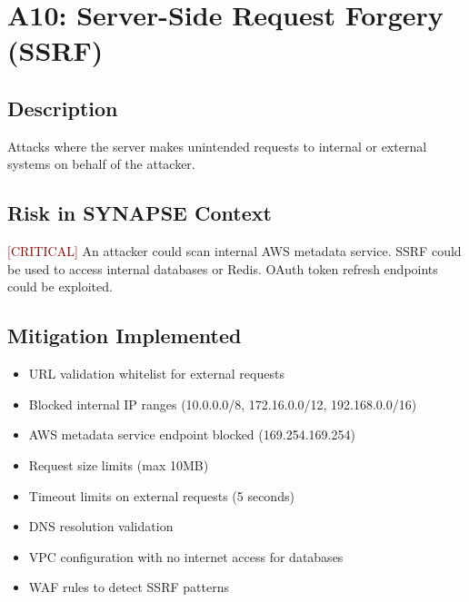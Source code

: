 \documentclass{report}
\begin{document}
\section{A10: Server-Side Request Forgery (SSRF)}

\subsection{Description}
Attacks where the server makes unintended requests to internal or external systems on behalf of the attacker.

\subsection{Risk in SYNAPSE Context}
\textcolor{darkred}{[CRITICAL]} An attacker could scan internal AWS metadata service. SSRF could be used to access internal databases or Redis. OAuth token refresh endpoints could be exploited.

\subsection{Mitigation Implemented}
\begin{itemize}
\item URL validation whitelist for external requests
\item Blocked internal IP ranges (10.0.0.0/8, 172.16.0.0/12, 192.168.0.0/16)
\item AWS metadata service endpoint blocked (169.254.169.254)
\item Request size limits (max 10MB)
\item Timeout limits on external requests (5 seconds)
\item DNS resolution validation
\item VPC configuration with no internet access for databases
\item WAF rules to detect SSRF patterns
\end{itemize}
\end{document}
